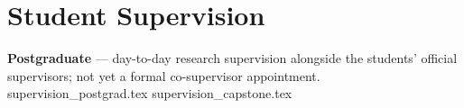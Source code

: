 \section{Student Supervision}

\textbf{Postgraduate} --- \small{day-to-day research supervision alongside the
students' official supervisors; not yet a formal co-supervisor appointment.}
{supervision_postgrad.tex}
{supervision_capstone.tex}
